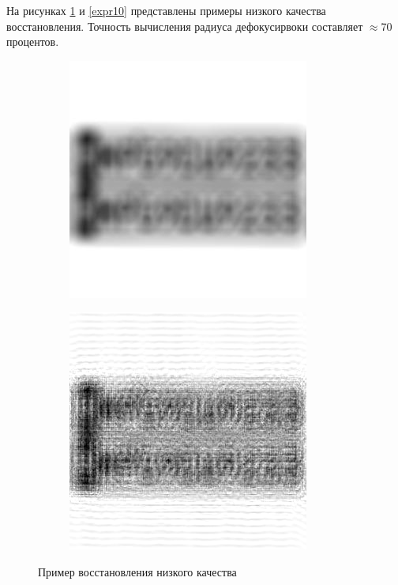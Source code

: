 \clearpage

На рисунках \ref{expr9} и \ref{expr10} представлены примеры низкого качества восстановления. Точность вычисления радиуса дефокусирвоки составляет $\approx$70 процентов.

\begin{figure}[!h]
	\centering
	\begin{subfigure}{.5\textwidth}
		\centering
		\includegraphics[scale=0.65]{assets/car_bad}
	\end{subfigure}%
	\begin{subfigure}{.5\textwidth}
		\centering
		\includegraphics[scale=0.85]{assets/car_bad_result}
	\end{subfigure}
	\caption{Пример восстановления низкого качества}
	\label{expr9}
\end{figure}

